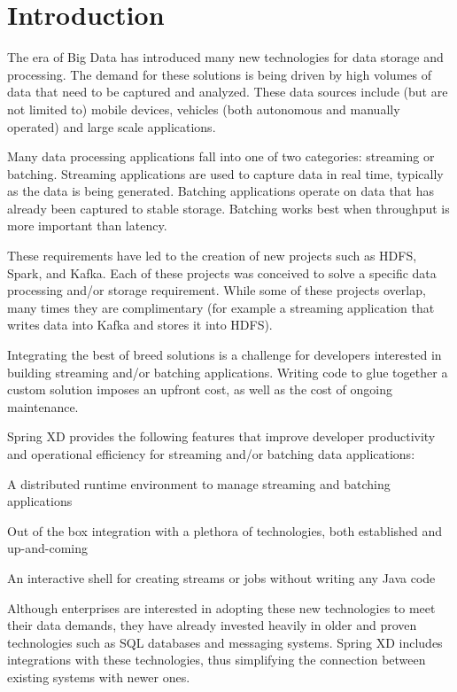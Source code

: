 \section{Introduction}

The era of Big Data has introduced many new technologies for data storage
and processing. The demand for these solutions is being driven by high
volumes of data that need to be captured and analyzed. These data sources
include (but are not limited to) mobile devices, vehicles (both autonomous
and manually operated) and large scale applications.

Many data processing applications fall into one of two categories:
streaming or batching. Streaming applications are used to capture data
in real time, typically as the data is being generated. Batching applications
operate on data that has already been captured to stable storage. Batching
works best when throughput is more important than latency.

These requirements have led to the creation of new projects such as HDFS\cite{hdfs},
Spark\cite{spark}, and Kafka\cite{kafka}. Each of these projects was conceived
to solve a specific data processing and/or storage requirement. While some
of these projects overlap, many times they are complimentary (for example
a streaming application that writes data into Kafka and stores it into HDFS).

Integrating the best of breed solutions is a challenge for developers
interested in building streaming and/or batching applications. Writing
code to glue together a custom solution imposes an upfront cost,
as well as the cost of ongoing maintenance.

Spring XD provides the following features that improve developer
productivity and operational efficiency for streaming and/or batching
data applications:
\begin{itemize*}
\item A distributed runtime environment to manage streaming and batching applications
\item Out of the box integration with a plethora of technologies, both established
and up-and-coming
\item An interactive shell for creating streams or jobs without writing any Java code
\end{itemize*}

Although enterprises are interested in adopting these new technologies to
meet their data demands, they have already invested heavily in older and proven
technologies such as SQL databases and messaging systems. Spring XD includes
integrations with these technologies, thus simplifying the connection between
existing systems with newer ones.

